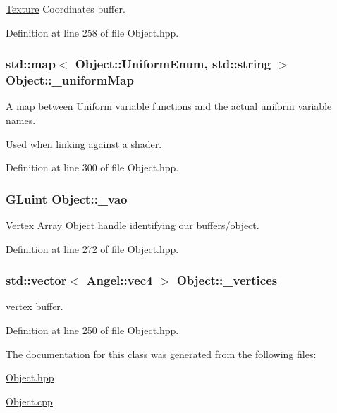 \hyperlink{class_texture}{Texture} Coordinates buffer. 



Definition at line 258 of file Object.\-hpp.

\hypertarget{class_object_a6378d0b0eeec23045ae2a5245e42bf13}{
\subsubsection[{\-\_\-uniform\-Map}]{\setlength{\rightskip}{0pt plus 5cm}std\-::map$<$ {\bf Object\-::\-Uniform\-Enum}, std\-::string $>$ Object\-::\-\_\-uniform\-Map\hspace{0.3cm}{\ttfamily [protected]}}}\label{class_object_a6378d0b0eeec23045ae2a5245e42bf13}


A map between Uniform variable functions and the actual uniform variable names. 

Used when linking against a shader. 

Definition at line 300 of file Object.\-hpp.

\hypertarget{class_object_a564aa6b1df66a05ab6b6c2f071851c4e}{
\subsubsection[{\-\_\-vao}]{\setlength{\rightskip}{0pt plus 5cm}G\-Luint Object\-::\-\_\-vao\hspace{0.3cm}{\ttfamily [protected]}}}\label{class_object_a564aa6b1df66a05ab6b6c2f071851c4e}


Vertex Array \hyperlink{class_object}{Object} handle identifying our buffers/object. 



Definition at line 272 of file Object.\-hpp.

\hypertarget{class_object_a4ac354b3ec284f27358b1d4b8d95b9a9}{
\subsubsection[{\-\_\-vertices}]{\setlength{\rightskip}{0pt plus 5cm}std\-::vector$<$ {\bf Angel\-::vec4} $>$ Object\-::\-\_\-vertices}}\label{class_object_a4ac354b3ec284f27358b1d4b8d95b9a9}


vertex buffer. 



Definition at line 250 of file Object.\-hpp.



The documentation for this class was generated from the following files\-:\begin{DoxyCompactItemize}
\item 
\hyperlink{_object_8hpp}{Object.\-hpp}\item 
\hyperlink{_object_8cpp}{Object.\-cpp}\end{DoxyCompactItemize}

